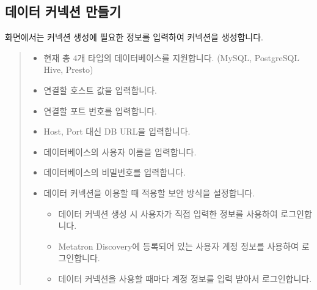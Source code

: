 \documentclass[letterpaper,10pt,english]{sphinxmanual}
\begin{document}
\subsection{데이터 커넥션 만들기}
\label{\detokenize{discovery/part02/data_connection:create-data-connection}}\label{\detokenize{discovery/part02/data_connection:id3}}
 화면에서는 커넥션 생성에 필요한 정보를 입력하여 커넥션을 생성합니다.
\begin{quote}

\begin{figure}[H]
\centering

\noindent{}
\end{figure}
\begin{itemize}
\item {} 
 현재 총 4개 타입의 데이터베이스를 지원합니다. (MySQL, PostgreSQL Hive, Presto)

\item {} 
 연결할 호스트 값을 입력합니다.

\item {} 
 연결할 포트 번호를 입력합니다.

\item {} 
 Host, Port 대신 DB URL을 입력합니다.

\item {} 
 데이터베이스의 사용자 이름을 입력합니다.

\item {} 
 데이터베이스의 비밀번호를 입력합니다.

\item {} 
 데이터 커넥션을 이용할 때 적용할 보안 방식을 설정합니다.
\begin{itemize}
\item {} 
 데이터 커넥션 생성 시 사용자가 직접 입력한 정보를 사용하여 로그인합니다.

\item {} 
 Metatron Discovery에 등록되어 있는 사용자 계정 정보를 사용하여 로그인합니다.

\item {} 
 데이터 커넥션을 사용할 때마다 계정 정보를 입력 받아서 로그인합니다.

\end{itemize}


\end{itemize}
\end{quote}
\end{document}
